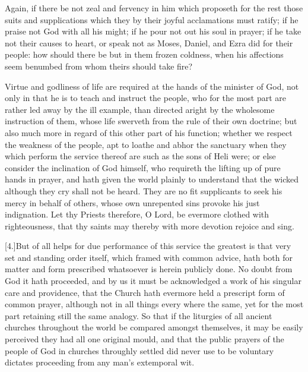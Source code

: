 Again, if there be not zeal and fervency in him which proposeth for the rest those suits and supplications which they by their joyful acclamations must ratify; if he praise not God with all his might; if he pour not out his soul in prayer; if he take not their causes to heart, or speak not as Moses, Daniel, and Ezra did for their people: how should there be but in them frozen coldness, when his affections seem benumbed from whom theirs should take fire?

Virtue and godliness of life are required at the hands of the minister of God, not only in that he is to teach and instruct the people, who for the most part are rather led away by the ill example, than directed aright by the wholesome instruction of them, whose life swerveth from the rule of their own doctrine; but also much more in regard of this other part of his function; whether we respect the weakness of the people, apt to loathe and abhor the sanctuary when they which perform the service thereof are such as the sons of Heli were; or else consider the inclination of God himself, who requireth the lifting up of pure hands in prayer, and hath given the world plainly to understand that the wicked although they cry shall not be heard. They are no fit supplicants to seek his mercy in behalf of others, whose own unrepented sins provoke his just indignation. Let thy Priests therefore, O  Lord, be evermore clothed with righteousness, that thy saints may thereby with more devotion rejoice and sing.

[4.]But of all helps for due performance of this service the greatest is that very set and standing order itself, which framed with common advice, hath both for matter and form prescribed whatsoever is herein publicly done. No doubt from God it hath proceeded, and by us it must be acknowledged a work of his singular care and providence, that the Church hath evermore held a prescript form of common prayer, although not in all things every where the same, yet for the most part retaining still the same analogy. So that if the liturgies of all ancient churches throughout the world be compared amongst themselves, it may be easily perceived they had all one original mould, and that the public prayers of the people of God in churches throughly settled did never use to be voluntary dictates proceeding from any man’s extemporal wit.


